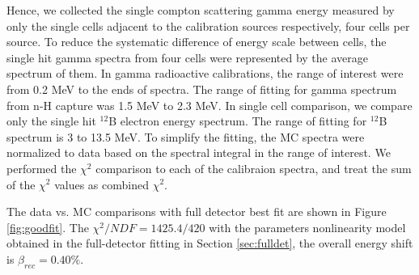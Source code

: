 Hence, we collected the single compton scattering gamma energy measured by only the single cells adjacent to the calibration sources respectively, four cells per source.
To reduce the systematic difference of energy scale between cells, the single hit gamma spectra from four cells were represented by the average spectrum of them. 
In gamma radioactive calibrations, the range of interest were from 0.2 MeV to the ends of spectra.
The range of fitting for gamma spectrum from n-H capture was 1.5 MeV to 2.3 MeV.
In single cell comparison, we compare only the single hit $^{12}$B electron energy spectrum.
The range of fitting for $^{12}$B spectrum is 3 to 13.5 MeV. 
To simplify the fitting, the MC spectra were normalized to data based on the spectral integral in the range of interest.
We performed the $\chi^2$ comparison to each of the calibraion spectra, and treat the sum of the $\chi^2$ values as combined $\chi^2$. 

The data vs. MC comparisons with full detector best fit are shown in Figure \ref{fig:goodfit}. 
The $\chi^2/NDF = 1425.4/420$ with the parameters nonlinearity model obtained in the full-detector fitting in Section \ref{sec:fulldet}, the overall energy shift is $\beta_{rec} = 0.40\%$.

